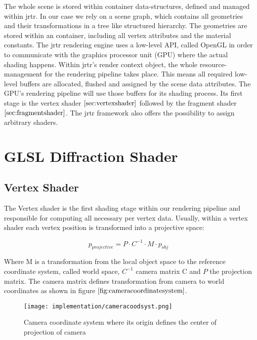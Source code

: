 The whole scene is stored within container data-structures, defined and managed within jrtr. In our case we rely on a scene graph, which contains all geometries and their transformations in a tree like structured hierarchy. The geometries are stored within an container, including all vertex attributes and the material constants. The jrtr rendering engine uses a low-level API, called OpenGL in order to communicate with the graphics processor unit (GPU) where the actual shading happens. Within jrtr's render context object, the whole resource-management for the rendering pipeline takes place. This means all required low-level buffers are allocated, flushed and assigned by the scene data attributes. The GPU's rendering pipeline will use those buffers for its shading process. Its first stage is the vertex shader $\ref{sec:vertexshader}$ followed by the fragment shader $\ref{sec:fragmentshader}$. The jrtr framework also offers the possibility to assign arbitrary shaders.

\section{GLSL Diffraction Shader}
\subsection{Vertex Shader}
\label{sec:vertexshader}
The Vertex shader is the first shading stage within our rendering pipeline and responsible for computing all necessary per vertex data. Usually, within a vertex shader each vertex position is transformed into a projective space:

\begin{equation}
  p_{projective} = P \cdot C^{-1} \cdot M \cdot p_{obj}
\end{equation}

Where M is a transformation from the local object space to the reference coordinate system, called world space, $C^{-1}$ camera matrix C and $P$ the projection matrix. The camera matrix defines transformation from camera to world coordinates as shown in figure $\ref{fig:cameracoordinatesystem}$.

\begin{figure}[H]
  \centering
  \texttt{[image: implementation/cameracoodsyst.png]}
  \caption{Camera coordinate system where its origin defines the center of projection of camera}
  \label{fig:cameracoordinatesystem}
\end{figure}

